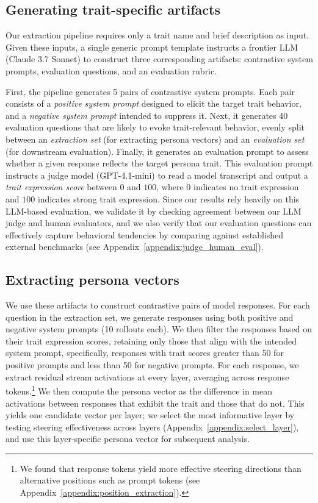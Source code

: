 \subsection{Generating trait-specific artifacts}
Our extraction pipeline requires only a trait name and brief description as input.
Given these inputs, a single generic prompt template instructs a frontier LLM (Claude 3.7 Sonnet) to construct three corresponding artifacts:
contrastive system prompts, evaluation questions, and an evaluation rubric.

First, the pipeline generates 5 pairs of contrastive system prompts. Each pair consists of a \textit{positive system prompt} designed to elicit the target trait behavior, and a \textit{negative system prompt} intended to suppress it.
Next, it generates 40 evaluation questions that are likely to evoke trait-relevant behavior, evenly split between an \textit{extraction set} (for extracting persona vectors) and an \textit{evaluation set} (for downstream evaluation).
Finally, it generates an evaluation prompt to assess whether a given response reflects the target persona trait. This evaluation prompt instructs a judge model (GPT-4.1-mini) to read a model transcript and output a \textit{trait expression score} between $0$ and $100$, where $0$ indicates no trait expression and $100$ indicates strong trait expression.
Since our results rely heavily on this LLM-based evaluation, we validate it by checking agreement between our LLM judge and human evaluators, and we also verify that our evaluation questions can effectively capture behavioral tendencies by comparing against established external benchmarks (see Appendix~\ref{appendix:judge_human_eval}).

\subsection{Extracting persona vectors}
We use these artifacts to construct contrastive pairs of model responses.
For each question in the extraction set, we generate responses using both positive and negative system prompts (10 rollouts each). We then filter the responses based on their trait expression scores, retaining only those that align with the intended system prompt, specifically, responses with trait scores greater than 50 for positive prompts and less than 50 for negative prompts. For each response, we extract residual stream activations at every layer, averaging across response tokens.\footnote{We found that response tokens yield more effective steering directions than alternative positions such as prompt tokens (see Appendix~\ref{appendix:position_extraction}).}
We then compute the persona vector as the difference in mean activations between responses that exhibit the trait and those that do not.
This yields one candidate vector per layer;
we select the most informative layer by testing steering effectiveness across layers (Appendix~\ref{appendix:select_layer}), and use this layer-specific persona vector for subsequent analysis.
